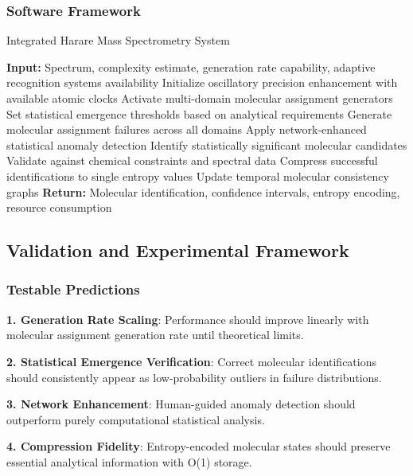 \documentclass[11pt,a4paper]{article}
\theoremstyle{remark}
\begin{document}
\subsubsection{Software Framework}

\begin{algorithm}[H]
\caption{Integrated Harare Mass Spectrometry System}
\begin{algorithmic}[1]
\State \textbf{Input:} Spectrum, complexity estimate, generation rate capability, adaptive recognition systems availability
\State Initialize oscillatory precision enhancement with available atomic clocks
\State Activate multi-domain molecular assignment generators
\State Set statistical emergence thresholds based on analytical requirements
\State Generate molecular assignment failures across all domains
\State Apply network-enhanced statistical anomaly detection
\State Identify statistically significant molecular candidates
\State Validate against chemical constraints and spectral data
\State Compress successful identifications to single entropy values
\State Update temporal molecular consistency graphs
\EndFor
\State \textbf{Return:} Molecular identification, confidence intervals, entropy encoding, resource consumption
\end{algorithmic}
\end{algorithm}

\subsection{Validation and Experimental Framework}

\subsubsection{Testable Predictions}

\textbf{1. Generation Rate Scaling}: Performance should improve linearly with molecular assignment generation rate until theoretical limits.

\textbf{2. Statistical Emergence Verification}: Correct molecular identifications should consistently appear as low-probability outliers in failure distributions.

\textbf{3. Network Enhancement}: Human-guided anomaly detection should outperform purely computational statistical analysis.

\textbf{4. Compression Fidelity}: Entropy-encoded molecular states should preserve essential analytical information with O(1) storage.
\end{document}
